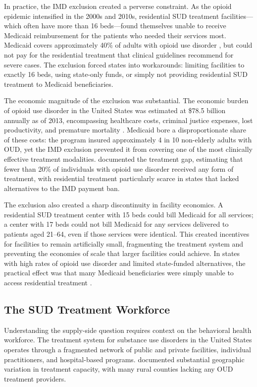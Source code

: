 \documentclass[12pt]{article}
\begin{document}
In practice, the IMD exclusion created a perverse constraint. As the opioid epidemic intensified in the 2000s and 2010s, residential SUD treatment facilities---which often have more than 16 beds---found themselves unable to receive Medicaid reimbursement for the patients who needed their services most. Medicaid covers approximately 40\% of adults with opioid use disorder \citep{kaiser2019opioid}, but could not pay for the residential treatment that clinical guidelines recommend for severe cases. The exclusion forced states into workarounds: limiting facilities to exactly 16 beds, using state-only funds, or simply not providing residential SUD treatment to Medicaid beneficiaries.

The economic magnitude of the exclusion was substantial. The economic burden of opioid use disorder in the United States was estimated at \$78.5 billion annually as of 2013, encompassing healthcare costs, criminal justice expenses, lost productivity, and premature mortality \citep{florence2021economic}. Medicaid bore a disproportionate share of these costs: the program insured approximately 4 in 10 non-elderly adults with OUD, yet the IMD exclusion prevented it from covering one of the most clinically effective treatment modalities. \citet{volkow2014medication} documented the treatment gap, estimating that fewer than 20\% of individuals with opioid use disorder received any form of treatment, with residential treatment particularly scarce in states that lacked alternatives to the IMD payment ban.

The exclusion also created a sharp discontinuity in facility economics. A residential SUD treatment center with 15 beds could bill Medicaid for all services; a center with 17 beds could not bill Medicaid for any services delivered to patients aged 21--64, even if those services were identical. This created incentives for facilities to remain artificially small, fragmenting the treatment system and preventing the economies of scale that larger facilities could achieve. In states with high rates of opioid use disorder and limited state-funded alternatives, the practical effect was that many Medicaid beneficiaries were simply unable to access residential treatment \citep{haffajee2019characteristics}.

\subsection{The SUD Treatment Workforce}

Understanding the supply-side question requires context on the behavioral health workforce. The treatment system for substance use disorders in the United States operates through a fragmented network of public and private facilities, individual practitioners, and hospital-based programs. \citet{jones2015national} documented substantial geographic variation in treatment capacity, with many rural counties lacking any OUD treatment providers.
\end{document}
